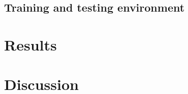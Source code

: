 \documentclass[dwyatte_dissertation.tex]{subfiles}
\begin{document}



\subsection{Training and testing environment}

\section{Results}

\section{Discussion}



\end{document}
